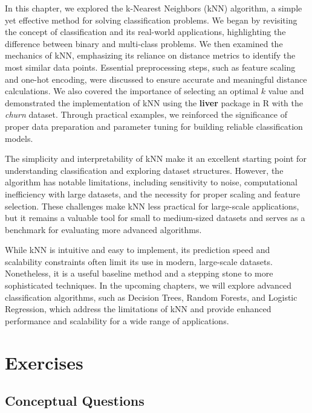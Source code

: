\documentclass[
  11pt,
]{book}
\theoremstyle{definition}
\theoremstyle{definition}
\theoremstyle{definition}
\theoremstyle{definition}
\theoremstyle{remark}
\begin{document}
In this chapter, we explored the k-Nearest Neighbors (kNN) algorithm, a simple yet effective method for solving classification problems. We began by revisiting the concept of classification and its real-world applications, highlighting the difference between binary and multi-class problems. We then examined the mechanics of kNN, emphasizing its reliance on distance metrics to identify the most similar data points. Essential preprocessing steps, such as feature scaling and one-hot encoding, were discussed to ensure accurate and meaningful distance calculations. We also covered the importance of selecting an optimal \(k\) value and demonstrated the implementation of kNN using the \textbf{liver} package in R with the \emph{churn} dataset. Through practical examples, we reinforced the significance of proper data preparation and parameter tuning for building reliable classification models.

The simplicity and interpretability of kNN make it an excellent starting point for understanding classification and exploring dataset structures. However, the algorithm has notable limitations, including sensitivity to noise, computational inefficiency with large datasets, and the necessity for proper scaling and feature selection. These challenges make kNN less practical for large-scale applications, but it remains a valuable tool for small to medium-sized datasets and serves as a benchmark for evaluating more advanced algorithms.

While kNN is intuitive and easy to implement, its prediction speed and scalability constraints often limit its use in modern, large-scale datasets. Nonetheless, it is a useful baseline method and a stepping stone to more sophisticated techniques. In the upcoming chapters, we will explore advanced classification algorithms, such as Decision Trees, Random Forests, and Logistic Regression, which address the limitations of kNN and provide enhanced performance and scalability for a wide range of applications.

\section{Exercises}\label{exercises-5}

\subsection*{Conceptual Questions}\label{conceptual-questions-3}
\end{document}

